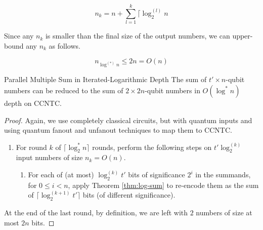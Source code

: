\begin{equation}
n_k = n + \sum_{l=1}^k \lceil \log_2^{(l)}n
\end{equation}

Since any $n_k$ is smaller than the final size of the output numbers,
we can upper-bound any $n_k$ as follows.

\begin{equation}
n_{\log^{(*)}n} \le 2n = O(n)
\end{equation}

\begin{theorem}{Parallel Multiple Sum in Iterated-Logarithmic Depth}
The sum of $t' \times n$-qubit numbers can be reduced to the sum
of $2 \times 2n$-qubit numbers in $O(\log^{*}n)$ depth on CCNTC.
\end{theorem}

\begin{proof}
Again, we use completely classical circuits, but with quantum inputs and
using quantum fanout and unfanout techniques to map them to CCNTC.

\begin{enumerate}

\item For round $k$ of $\lceil \log_2^{*} n \rceil$ rounds, perform the following
steps on $t'\log_2^{(k)}$ input numbers of size $n_k = O(n)$. 

\begin{enumerate}

\item
For each of (at most) $\log_2^{(k)}t'$ bits of significance $2^i$ in the summands, for 
$0 \le i < n$, apply Theorem \ref{thm:log-sum} to re-encode them as the sum of
$\lceil \log_2^{(k+1)}t' \rceil$ bits (of different significance). 

\end{enumerate}

\end{enumerate}

At the end of the last round, by definition, we are left with $2$ numbers of size
at most $2n$ bits.
\end{proof}